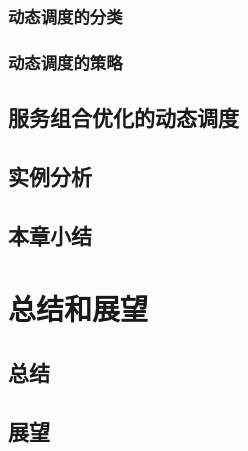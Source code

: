 \documentclass[UTF8]{ctexart}
\begin{document}
		\subsubsection{动态调度的分类}
		\subsubsection{动态调度的策略}
	\subsection{服务组合优化的动态调度}
	\subsection{实例分析}
	\subsection{本章小结}

\section{总结和展望}
	\subsection{总结}
	\subsection{展望}
\end{document}
